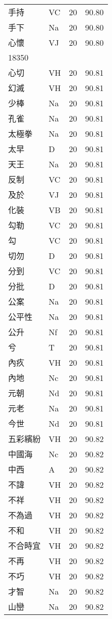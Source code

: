 \documentclass[twocolumn]{book}
\begin{document}
\begin{supertabular}{llrr}
手持 & VC & 20 &  90.80\\
手下 & Na & 20 &  90.80\\
心懷 & VJ & 20 &  90.80\\
18350\\
心切 & VH & 20 &  90.81\\
幻滅 & VH & 20 &  90.81\\
少棒 & Na & 20 &  90.81\\
孔雀 & Na & 20 &  90.81\\
太極拳 & Na & 20 &  90.81\\
太早 & D & 20 &  90.81\\
天王 & Na & 20 &  90.81\\
反制 & VC & 20 &  90.81\\
及於 & VJ & 20 &  90.81\\
化裝 & VB & 20 &  90.81\\
勾勒 & VC & 20 &  90.81\\
勾 & VC & 20 &  90.81\\
切勿 & D & 20 &  90.81\\
分到 & VC & 20 &  90.81\\
分批 & D & 20 &  90.81\\
公案 & Na & 20 &  90.81\\
公平性 & Na & 20 &  90.81\\
公升 & Nf & 20 &  90.81\\
兮 & T & 20 &  90.81\\
內疚 & VH & 20 &  90.81\\
內地 & Nc & 20 &  90.81\\
元朝 & Nd & 20 &  90.81\\
元老 & Na & 20 &  90.81\\
今世 & Nd & 20 &  90.81\\
五彩繽紛 & VH & 20 &  90.82\\
中國海 & Nc & 20 &  90.82\\
中西 & A & 20 &  90.82\\
不諱 & VH & 20 &  90.82\\
不祥 & VH & 20 &  90.82\\
不為過 & VH & 20 &  90.82\\
不和 & VH & 20 &  90.82\\
不合時宜 & VH & 20 &  90.82\\
不再 & VH & 20 &  90.82\\
不巧 & VH & 20 &  90.82\\
才智 & Na & 20 &  90.82\\
山巒 & Na & 20 &  90.82\\

\end{supertabular}
\end{document}
